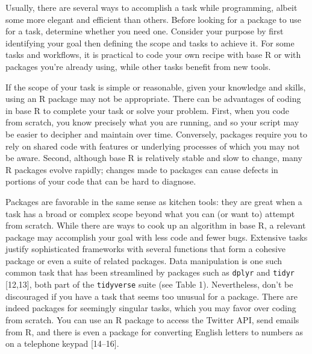 \documentclass[10pt,letterpaper]{article}
\begin{document}
Usually, there are several ways to accomplish a task while programming,
albeit some more elegant and efficient than others. Before looking for a
package to use for a task, determine whether you need one. Consider your
purpose by first identifying your goal then defining the scope and tasks
to achieve it. For some tasks and workflows, it is practical to code
your own recipe with base R or with packages you're already using, while
other tasks benefit from new tools.

If the scope of your task is simple or reasonable, given your knowledge
and skills, using an R package may not be appropriate. There can be
advantages of coding in base R to complete your task or solve your
problem. First, when you code from scratch, you know precisely what you
are running, and so your script may be easier to decipher and maintain
over time. Conversely, packages require you to rely on shared code with
features or underlying processes of which you may not be aware. Second,
although base R is relatively stable and slow to change, many R packages
evolve rapidly; changes made to packages can cause defects in portions
of your code that can be hard to diagnose.

Packages are favorable in the same sense as kitchen tools: they are
great when a task has a broad or complex scope beyond what you can (or
want to) attempt from scratch. While there are ways to cook up an
algorithm in base R, a relevant package may accomplish your goal with
less code and fewer bugs. Extensive tasks justify sophisticated
frameworks with several functions that form a cohesive package or even a
suite of related packages. Data manipulation is one such common task
that has been streamlined by packages such as \texttt{dplyr} and
\texttt{tidyr} {[}12,13{]}, both part of the \texttt{tidyverse} suite
(see Table 1). Nevertheless, don't be discouraged if you have a task
that seems too unusual for a package. There are indeed packages for
seemingly singular tasks, which you may favor over coding from scratch.
You can use an R package to access the Twitter API, send emails from R,
and there is even a package for converting English letters to numbers as
on a telephone keypad {[}14--16{]}.
\end{document}
